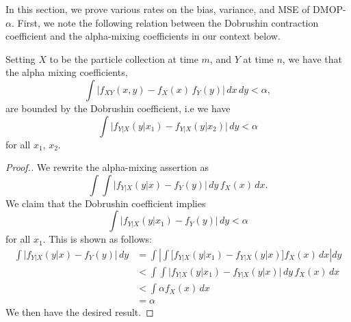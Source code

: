 

In this section, we prove various rates on the bias, variance, and MSE of DMOP-$\alpha$. 
First, we note the following relation between the Dobrushin contraction coefficient and the alpha-mixing coefficients in our context below.
\begin{lem}
    \label{lem:dobrushin-implies-alpha-mixing}
    Setting $X$ to be the particle collection at time $m$, and $Y$ at time $n$, we have that the alpha mixing coefficients,
    \begin{equation}
    \int \big| f_{XY}(x,y) - f_X (x)\, f_Y(y) \big|\, dx\, dy < \alpha,
    \end{equation}
    are bounded by the Dobrushin coefficient, i.e we have
    \begin{equation}
    \int \big| f_{Y|X}(y|x_1) - f_{Y|X}(y|x_2) \big| \, dy < \alpha
    \end{equation} 
    for all $x_1$, $x_2$.
\end{lem}

\begin{proof}[Proof.]
    We rewrite the alpha-mixing assertion as 
    \begin{equation}
    \int { \int \big|f_{Y|X}(y|x) - f_Y(y)\big| \, dy } \, f_X(x) \, dx.
    \end{equation}
    We claim that the Dobrushin coefficient implies 
    \begin{equation}
    \int \big| f_{Y|X}(y|x_1) - f_Y(y) \big| \, dy < \alpha
    \end{equation} 
    for all $x_1$. This is shown as follows:
    \begin{align}
        \int \big| f_{Y|X}(y|x) - f_Y(y) \big| \, dy 
        &= \int \left|  \int \big[f_{Y|X}(y|x_1) - f_{Y|X}(y|x)\big] f_X(x) \, dx \right|dy \\
        &< \int   \int  \big| f_{Y|X}(y|x_1) - f_{Y|X}(y|x)\big| \, dy \, f_X(x)\, dx \\
        &< \int \alpha f_X(x) \, dx \\
        &=\alpha
    \end{align}
    We then have the desired result.
\end{proof}

